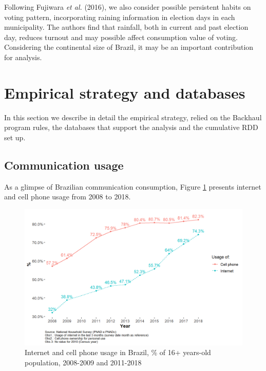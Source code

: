 \documentclass[
  12pt,
]{article}
\begin{document}
Following Fujiwara \emph{et al.} (2016), we also consider possible
persistent habits on voting pattern, incorporating raining information
in election days in each municipality. The authors find that rainfall,
both in current and past election day, reduces turnout and may possible
affect consumption value of voting. Considering the continental size of
Brazil, it may be an important contribution for analysis.

\hypertarget{empirical-strategy-and-databases}{%
\section{Empirical strategy and
databases}\label{empirical-strategy-and-databases}}

In this section we describe in detail the empirical strategy, relied on
the Backhaul program rules, the databases that support the analysis and
the cumulative RDD set up.

\hypertarget{communication-usage}{%
\subsection{Communication usage}\label{communication-usage}}

As a glimpse of Brazilian communication consumption, Figure \ref{fig:0}
presents internet and cell phone usage from 2008 to 2018.

\begin{figure}
\centering
\includegraphics{artigo1_files/figure-latex/internet_usage-1.png}
\caption{Internet and cell phone usage in Brazil, \% of 16+ years-old
population, 2008-2009 and 2011-2018 \label{fig:0}}
\end{figure}
\end{document}
